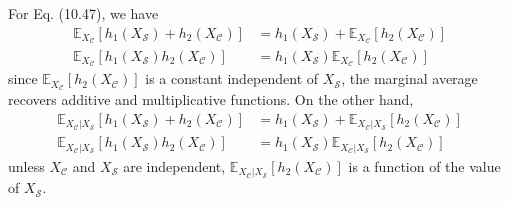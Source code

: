 \begin{exercise}
  For Eq. (10.47), we have
  \begin{subequations}
    \begin{align}
      \mathbb{E}_{X_{\mathcal{C}}}[h_1(X_{\mathcal{S}}) + h_2(X_{\mathcal{C}})]
      & = h_1(X_{\mathcal{S}}) +
      \mathbb{E}_{X_{\mathcal{C}}}[h_2(X_{\mathcal{C}})]
      \\
      \mathbb{E}_{X_{\mathcal{C}}}[h_1(X_{\mathcal{S}}) h_2(X_{\mathcal{C}})]
      & = h_1(X_{\mathcal{S}})
      \mathbb{E}_{X_{\mathcal{C}}}[h_2(X_{\mathcal{C}})]
    \end{align}
  \end{subequations}
  since $\mathbb{E}_{X_{\mathcal{C}}}[h_2(X_{\mathcal{C}})]$ is a constant
  independent of $X_{\mathcal{S}}$, the marginal average recovers additive and
  multiplicative functions. On the other hand,
  \begin{subequations}
    \begin{align}
      \mathbb{E}_{X_{\mathcal{C}}|X_{\mathcal{S}}}[h_1(X_{\mathcal{S}}) +
      h_2(X_{\mathcal{C}})] & = h_1(X_{\mathcal{S}}) +
      \mathbb{E}_{X_{\mathcal{C}}|X_{\mathcal{S}}}[h_2(X_{\mathcal{C}})]
      \\
      \mathbb{E}_{X_{\mathcal{C}}|X_{\mathcal{S}}}[h_1(X_{\mathcal{S}})
      h_2(X_{\mathcal{C}})] & = h_1(X_{\mathcal{S}})
      \mathbb{E}_{X_{\mathcal{C}}|X_{\mathcal{S}}}[h_2(X_{\mathcal{C}})]
    \end{align}
  \end{subequations}
  unless $X_{\mathcal{C}}$ and $X_{\mathcal{S}}$ are independent, $
  \mathbb{E}_{X_{\mathcal{C}}|X_{\mathcal{S}}}[h_2(X_{\mathcal{C}})]$ is a
  function of the value of $X_{\mathcal{S}}$.
\end{exercise}

\begin{exercise}[(Program)]
\end{exercise}

